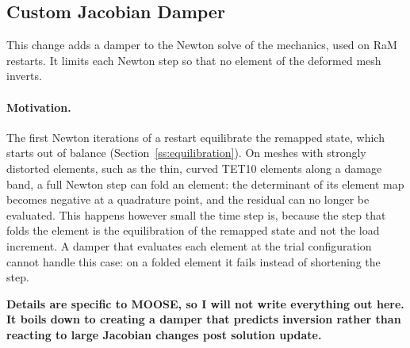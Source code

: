 


\FloatBarrier{}

\subsection{Custom Jacobian Damper}\label{ss:damper}

This change adds a damper to the Newton solve of the mechanics, used on RaM restarts. It limits each Newton step so that no element of the deformed mesh inverts.

\paragraph{Motivation.}
The first Newton iterations of a restart equilibrate the remapped state, which starts out of balance (Section~\ref{ss:equilibration}). On meshes with strongly distorted elements, such as the thin, curved TET10 elements along a damage band, a full Newton step can fold an element: the determinant of its element map becomes negative at a quadrature point, and the residual can no longer be evaluated. This happens however small the time step is, because the step that folds the element is the equilibration of the remapped state and not the load increment. A damper that evaluates each element at the trial configuration cannot handle this case: on a folded element it fails instead of shortening the step.

\textbf{Details are specific to MOOSE, so I will not write everything out here. It boils down to creating a damper that predicts inversion rather than reacting to large Jacobian changes post solution update.}

